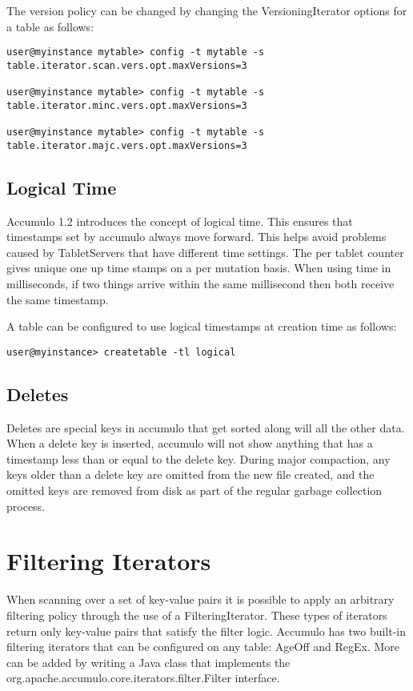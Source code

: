 The version policy can be changed by changing the VersioningIterator options for a
table as follows:

\small
\begin{verbatim}
user@myinstance mytable> config -t mytable -s
table.iterator.scan.vers.opt.maxVersions=3

user@myinstance mytable> config -t mytable -s
table.iterator.minc.vers.opt.maxVersions=3

user@myinstance mytable> config -t mytable -s
table.iterator.majc.vers.opt.maxVersions=3
\end{verbatim}
\normalsize

\subsection{Logical Time}

Accumulo 1.2 introduces the concept of logical time. This ensures that timestamps
set by accumulo always move forward. This helps avoid problems caused by
TabletServers that have different time settings. The per tablet counter gives unique
one up time stamps on a per mutation basis. When using time in milliseconds, if two
things arrive within the same millisecond then both receive the same timestamp.

A table can be configured to use logical timestamps at creation time as follows:

\small
\begin{verbatim}
user@myinstance> createtable -tl logical
\end{verbatim}
\normalsize

\subsection{Deletes}
Deletes are special keys in accumulo that get sorted along will all the other data.
When a delete key is inserted, accumulo will not show anything that has a
timestamp less than or equal to the delete key. During major compaction, any keys
older than a delete key are omitted from the new file created, and the omitted keys
are removed from disk as part of the regular garbage collection process.

\section{Filtering Iterators}
When scanning over a set of key-value pairs it is possible to apply an arbitrary
filtering policy through the use of a FilteringIterator. These types of iterators return
only key-value pairs that satisfy the filter logic. Accumulo has two built-in filtering
iterators that can be configured on any table: AgeOff and RegEx. More can be added
by writing a Java class that implements the\\
org.apache.accumulo.core.iterators.filter.Filter interface.


